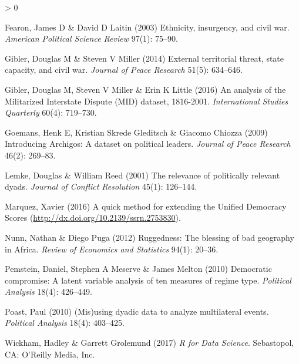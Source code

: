 \documentclass[
  11pt,
]{article}
\newlength{\cslhangindent}
\newenvironment{CSLReferences}[2] %
 {%
  \setlength{\parindent}{0pt}
  \ifodd #1 \everypar{\setlength{\hangindent}{\cslhangindent}}\ignorespaces\fi
  \ifnum #2 > 0
  \setlength{\parskip}{#2\baselineskip}
  \fi
 }%
 {}
\begin{document}
\begin{CSLReferences}{1}{0}
\leavevmode\hypertarget{ref-fearonlaitin2003eicw}{}%
Fearon, James D \& David D Laitin (2003) Ethnicity, insurgency, and civil war. \emph{American Political Science Review} 97(1): 75--90.

\leavevmode\hypertarget{ref-giblermiller2014etts}{}%
Gibler, Douglas M \& Steven V Miller (2014) External territorial threat, state capacity, and civil war. \emph{Journal of Peace Research} 51(5): 634--646.

\leavevmode\hypertarget{ref-gibleretal2016amid}{}%
Gibler, Douglas M, Steven V Miller \& Erin K Little (2016) An analysis of the {M}ilitarized {I}nterstate {D}ispute {(MID)} dataset, 1816-2001. \emph{International Studies Quarterly} 60(4): 719--730.

\leavevmode\hypertarget{ref-goemansetal2009ia}{}%
Goemans, Henk E, Kristian Skrede Gleditsch \& Giacomo Chiozza (2009) Introducing {A}rchigos: A dataset on political leaders. \emph{Journal of Peace Research} 46(2): 269--83.

\leavevmode\hypertarget{ref-lemkereed2001rprd}{}%
Lemke, Douglas \& William Reed (2001) The relevance of politically relevant dyads. \emph{Journal of Conflict Resolution} 45(1): 126--144.

\leavevmode\hypertarget{ref-marquez2016qme}{}%
Marquez, Xavier (2016) A quick method for extending the {U}nified {D}emocracy {S}cores (\url{http://dx.doi.org/10.2139/ssrn.2753830}).

\leavevmode\hypertarget{ref-nunnpuga2012r}{}%
Nunn, Nathan \& Diego Puga (2012) Ruggedness: The blessing of bad geography in {A}frica. \emph{Review of Economics and Statistics} 94(1): 20--36.

\leavevmode\hypertarget{ref-pemsteinetal2010dc}{}%
Pemstein, Daniel, Stephen A Meserve \& James Melton (2010) Democratic compromise: A latent variable analysis of ten measures of regime type. \emph{Political Analysis} 18(4): 426--449.

\leavevmode\hypertarget{ref-poast2010mdd}{}%
Poast, Paul (2010) (Mis)using dyadic data to analyze multilateral events. \emph{Political Analysis} 18(4): 403--425.

\leavevmode\hypertarget{ref-wickhamgrolemund2017rds}{}%
Wickham, Hadley \& Garrett Grolemund (2017) \emph{{R} for Data Science}. Sebastopol, CA: O'Reilly Media, Inc.

\end{CSLReferences}
\end{document}
